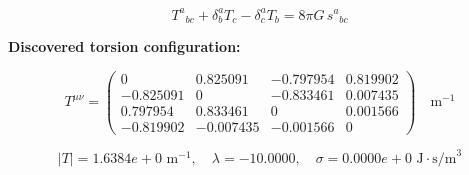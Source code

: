 
\begin{equation}
  T^a{}_{bc} + \delta^a_b T_c - \delta^a_c T_b = 8\pi G \, s^a{}_{bc}
\end{equation}

\textbf{Discovered torsion configuration:}

\begin{equation}
  T^{\mu\nu} = \begin{pmatrix}
    0 & 0.825091 & -0.797954 & 0.819902 \\
    -0.825091 & 0 & -0.833461 & 0.007435 \\
    0.797954 & 0.833461 & 0 & 0.001566 \\
    -0.819902 & -0.007435 & -0.001566 & 0
  \end{pmatrix} \quad \text{m}^{-1}
\end{equation}

\begin{equation}
  |T| = 1.6384e+0 \text{ m}^{-1}, \quad
  \lambda = -10.0000, \quad
  \sigma = 0.0000e+0 \text{ J}\cdot\text{s/m}^3
\end{equation}